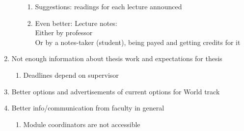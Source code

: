 \begin{enumerate}
\begin{enumerate}
\begin{enumerate}
\item Suggestions: readings for each lecture announced
\item Even better: Lecture notes:\\
         Either by professor\\
         Or by a notes-taker (student), being payed and getting credits for it
\end{enumerate}
\end{enumerate}
\item Not enough information about thesis work and expectations for thesis
\begin{enumerate}
\item Deadlines depend on supervisor
\end{enumerate}
\item Better options and advertisements of current options for World track
\item Better info/communication from faculty in general
\begin{enumerate}
\item Module coordinators are not accessible
\end{enumerate}
\end{enumerate}
